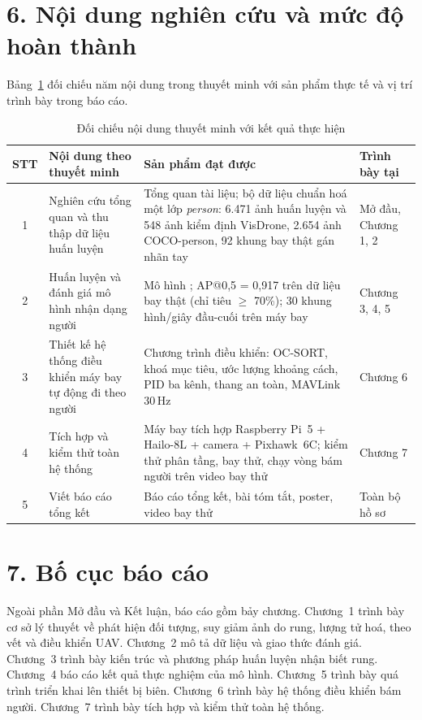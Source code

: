 \section*{6. Nội dung nghiên cứu và mức độ hoàn thành}

Bảng~\ref{tab:tiendo} đối chiếu năm nội dung trong thuyết minh với sản phẩm thực tế và vị trí trình bày trong báo cáo.

\begin{table}[H]
\centering
\caption{Đối chiếu nội dung thuyết minh với kết quả thực hiện}
\label{tab:tiendo}
\small
\renewcommand{\arraystretch}{1.15}
\begin{tabularx}{\textwidth}{@{}c>{\raggedright\arraybackslash}p{3.6cm}>{\raggedright\arraybackslash}X>{\raggedright\arraybackslash}p{2.1cm}@{}}
\toprule
\textbf{STT} & \textbf{Nội dung theo thuyết minh} & \textbf{Sản phẩm đạt được} & \textbf{Trình bày tại}\\
\midrule
1 & Nghiên cứu tổng quan và thu thập dữ liệu huấn luyện & Tổng quan tài liệu; bộ dữ liệu chuẩn hoá một lớp \textit{person}: 6.471 ảnh huấn luyện và 548 ảnh kiểm định VisDrone, 2.654 ảnh COCO-person, 92 khung bay thật gán nhãn tay & Mở đầu, Chương 1, 2\\
2 & Huấn luyện và đánh giá mô hình nhận dạng người & Mô hình \sd{}; AP@0,5 = 0,917 trên dữ liệu bay thật (chỉ tiêu $\ge$ 70\%); 30 khung hình/giây đầu-cuối trên máy bay & Chương 3, 4, 5\\
3 & Thiết kế hệ thống điều khiển máy bay tự động đi theo người & Chương trình điều khiển: OC-SORT, khoá mục tiêu, ước lượng khoảng cách, PID ba kênh, thang an toàn, MAVLink 30\,Hz & Chương 6\\
4 & Tích hợp và kiểm thử toàn hệ thống & Máy bay tích hợp Raspberry Pi~5 + Hailo-8L + camera + Pixhawk~6C; kiểm thử phân tầng, bay thử, chạy vòng bám người trên video bay thử & Chương 7\\
5 & Viết báo cáo tổng kết & Báo cáo tổng kết, bài tóm tắt, poster, video bay thử & Toàn bộ hồ sơ\\
\bottomrule
\end{tabularx}
\end{table}

\section*{7. Bố cục báo cáo}

Ngoài phần Mở đầu và Kết luận, báo cáo gồm bảy chương. Chương~1 trình bày cơ sở lý thuyết về phát hiện đối tượng, suy giảm ảnh do rung, lượng tử hoá, theo vết và điều khiển UAV. Chương~2 mô tả dữ liệu và giao thức đánh giá. Chương~3 trình bày kiến trúc \sd{} và phương pháp huấn luyện nhận biết rung. Chương~4 báo cáo kết quả thực nghiệm của mô hình. Chương~5 trình bày quá trình triển khai lên thiết bị biên. Chương~6 trình bày hệ thống điều khiển bám người. Chương~7 trình bày tích hợp và kiểm thử toàn hệ thống.
